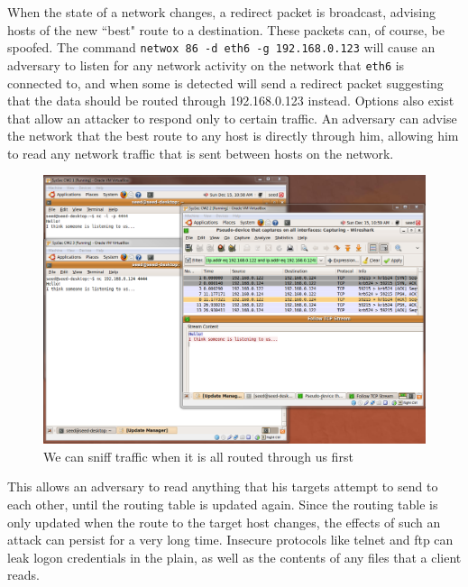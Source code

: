 When the state of a network changes, a redirect packet is broadcast, advising hosts of the new ``best" route to a
destination. These packets can, of course, be spoofed. The command {\tt netwox 86 -d eth6 -g 192.168.0.123} will cause
an adversary to listen for any network activity on the network that {\tt eth6} is connected to, and when some is
detected will send a redirect packet suggesting that the data should be routed through 192.168.0.123 instead. Options
also exist that allow an attacker to respond only to certain traffic. An adversary can advise the network that the best
route to any host is directly through him, allowing him to read any network traffic that is sent between hosts on the
network.



\begin{figure}[h]
    \centering
    \includegraphics[width=.7\linewidth]{images/icmp_redirect_after.png}
    \caption{We can sniff traffic when it is all routed through us first} \label{fig:icmp_after}
\end{figure}

This allows an adversary to read anything that his targets attempt to send to each other, until the routing table is
updated again. Since the routing table is only updated when the route to the target host changes, the effects of such an
attack can persist for a very long time. Insecure protocols like telnet and ftp can leak logon credentials in the plain,
as well as the contents of any files that a client reads.

